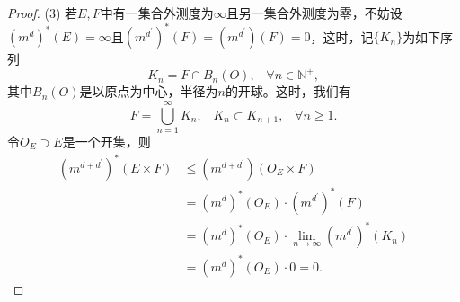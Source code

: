 \documentclass[reqno,a4paper,14pt]{amsart}
\begin{document}
\begin{proof}
    (3) 若$E,F$中有一集合外测度为$\infty$且另一集合外测度为零，不妨设$(m^d)^*(E)=\infty$且$(m^{d^\prime})^*(F)=(m^{d^\prime})(F)=0$，这时，记$\{K_n\}$为如下序列
    \begin{equation*}
        K_n=F\cap B_n(O),\;\;\;\forall n\in\mathbb{N}^+,
    \end{equation*}
    其中$B_n(O)$是以原点为中心，半径为$n$的开球。这时，我们有
    \begin{equation*}
        F=\bigcup_{n=1}^\infty K_n,\;\;\; K_n\subset K_{n+1},\;\;\; \forall n\geq 1.
    \end{equation*}
    令$O_E\supset E$是一个开集，则
    \begin{equation}
        \begin{split}
            (m^{d+d^\prime})^*(E\times F)&\leq(m^{d+d^\prime})(O_E\times F)\\
            &=(m^d)^*(O_E)\cdot (m^{d^\prime})^*(F)\\
            &=(m^d)^*(O_E)\cdot \lim_{n\to\infty}(m^{d^\prime})^*(K_n)\\
            &=(m^d)^*(O_E)\cdot 0=0.
            \label{zero}
        \end{split}
    \end{equation}
\end{proof}
\end{document}

